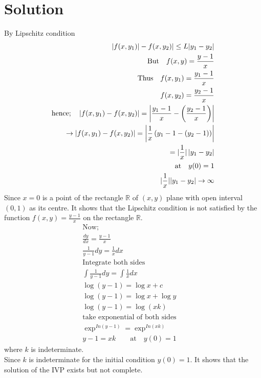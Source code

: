 \documentclass[a4paper, 12pt]{article}
\begin{document}
\section{Solution}
By Lipschitz condition\\
\begin{align*}
\arrowvert f(x,y_1) \arrowvert - f(x,y_2) \arrowvert \le L \arrowvert y_1 - y_2 \arrowvert\\
\text{But} \quad f(x,y) = \frac{y-1}{x} \\
\text{Thus} \quad f(x,y_1) = \frac{y_1 -1}{x} \\
f(x,y_2) = \frac{y_2 - 1}{x} \\
\text{hence}; \quad
\arrowvert f(x,y_1) - f(x,y_2) \arrowvert = \left| \frac{y_1 -1}{x} - \left( \frac{y_2 -1}{x}\right) \right| \\
\rightarrow \arrowvert f(x, y_1) - f(x, y_2) \arrowvert = \left|\frac{1}{x} \left(y_1 -1-(y_2-1)\right) \right| \\
= \arrowvert \frac{1}{x} \arrowvert \left| y_1 - y_2 \right|\\
\text{at} \quad y(0) = 1 \\
\arrowvert \frac{1}{x} \arrowvert \arrowvert y_1 - y_2 \arrowvert \rightarrow \infty
\end{align*}
Since $x=0$ is a point of the rectangle $\mathbb{R}$ of $(x,y)$ plane with open interval $(0,1)$ as its centre. It shows that the Lipschitz condition is not satisfied by the function $ f(x,y) = \frac{y-1}{x}$ on the rectangle $\mathbb{R}$.
\begin{align*}
\text{Now;} \quad \\
\frac{dy}{dx} = \frac{y-1}{x}\\
\frac{1}{y-1} dy = \frac{1}{x} dx \\
\text{Integrate both sides} \quad \\
\int \frac{1}{y-1} dy = \int \frac{1}{x} dx \\
\log (y-1) = \log x + c \\
\log (y-1) = \log x + \log y \\
\log (y-1) = \log (xk) \\
\text{take exponential of both sides} \quad \\
\exp ^{In(y-1)} = \exp ^{In(xk)} \\ 
y-1 = xk \qquad \text{at} \quad y(0) = 1
\end{align*}
where $k$ is indeterminate. \\
Since $k$ is indeterminate for the initial condition $y(0) = 1 $. It shows that the solution of the IVP exists but not complete.
\end{document}
